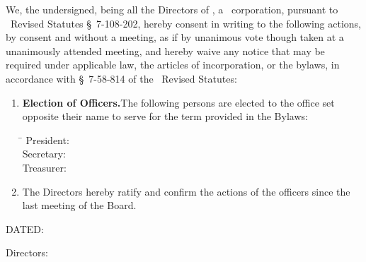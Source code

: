 
\bigskip

We, the undersigned, being all the Directors of \companyName, a \companyState\ corporation,
pursuant to \companyState\ Revised Statutes \S~7-108-202, hereby consent in writing to the
following actions, by consent and without a meeting, as if by unanimous vote though taken at a
unanimously attended meeting, and hereby waive any notice that may be required under applicable
law, the articles of incorporation, or the bylaws, in accordance with \S~7-58-814 of the
\companyState\ Revised Statutes:

\begin{enumerate}[leftmargin=*, label=\arabic*.]
	\item \textbf{Election of Officers.}\enspace The following persons are elected to the office
	set opposite their name to serve for the term provided in the Bylaws:

	\smallskip
	\begin{tabbing}
		\hspace{2.5cm}\=\kill
		President: \> \president \\
		Secretary: \> \secretary \\
		Treasurer: \> \treasurer
	\end{tabbing}

	\item The Directors hereby ratify and confirm the actions of the officers since the last
	meeting of the Board.
\end{enumerate}

\bigskip
\noindent DATED: \datedText

\bigskip
\noindent Directors:

\sigpair{\directorOne}{\directorTwo}
\sigpair{\directorThree}{\directorFour}
\sigpair{\directorFive}{\directorSix}
